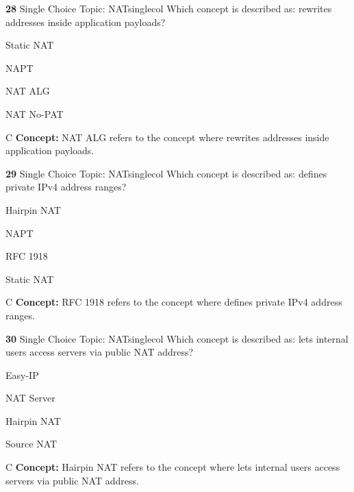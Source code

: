 \documentclass[10pt,a4paper]{article}
\begin{document}
\begin{qcard}{\color{white}\textbf{28} \hfill \small Single Choice \textbar{} Topic: NAT}{singlecol}
Which concept is described as: rewrites addresses inside application payloads?

\begin{qoptions}
\item Static NAT
\item NAPT
\item NAT ALG
\item NAT No-PAT
\end{qoptions}
\begin{explainbox}{C}
\textbf{Concept:} NAT ALG refers to the concept where rewrites addresses inside application payloads.
\end{explainbox}
\end{qcard}

\begin{qcard}{\color{white}\textbf{29} \hfill \small Single Choice \textbar{} Topic: NAT}{singlecol}
Which concept is described as: defines private IPv4 address ranges?

\begin{qoptions}
\item Hairpin NAT
\item NAPT
\item RFC 1918
\item Static NAT
\end{qoptions}
\begin{explainbox}{C}
\textbf{Concept:} RFC 1918 refers to the concept where defines private IPv4 address ranges.
\end{explainbox}
\end{qcard}

\begin{qcard}{\color{white}\textbf{30} \hfill \small Single Choice \textbar{} Topic: NAT}{singlecol}
Which concept is described as: lets internal users access servers via public NAT address?

\begin{qoptions}
\item Easy-IP
\item NAT Server
\item Hairpin NAT
\item Source NAT
\end{qoptions}
\begin{explainbox}{C}
\textbf{Concept:} Hairpin NAT refers to the concept where lets internal users access servers via public NAT address.
\end{explainbox}
\end{qcard}
\end{document}
